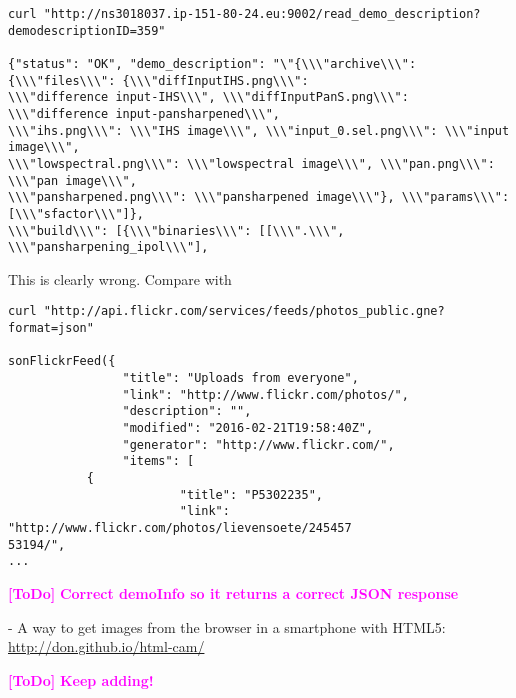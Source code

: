 \documentclass[a4paper,12pt]{article}
\newcommand{\ToDo}[1]{\textcolor{magenta}{\textbf{[ToDo]} \textbf{#1}}}
\begin{document}
\begin{verbatim}
curl "http://ns3018037.ip-151-80-24.eu:9002/read_demo_description?demodescriptionID=359"

{"status": "OK", "demo_description": "\"{\\\"archive\\\": {\\\"files\\\": {\\\"diffInputIHS.png\\\":
\\\"difference input-IHS\\\", \\\"diffInputPanS.png\\\": \\\"difference input-pansharpened\\\",
\\\"ihs.png\\\": \\\"IHS image\\\", \\\"input_0.sel.png\\\": \\\"input image\\\",
\\\"lowspectral.png\\\": \\\"lowspectral image\\\", \\\"pan.png\\\": \\\"pan image\\\",
\\\"pansharpened.png\\\": \\\"pansharpened image\\\"}, \\\"params\\\": [\\\"sfactor\\\"]},
\\\"build\\\": [{\\\"binaries\\\": [[\\\".\\\", \\\"pansharpening_ipol\\\"],
\end{verbatim}

This is clearly wrong. Compare with
\begin{verbatim}
curl "http://api.flickr.com/services/feeds/photos_public.gne?format=json"

sonFlickrFeed({
                "title": "Uploads from everyone",
                "link": "http://www.flickr.com/photos/",
                "description": "",
                "modified": "2016-02-21T19:58:40Z",
                "generator": "http://www.flickr.com/",
                "items": [
           {
                        "title": "P5302235",
                        "link": "http://www.flickr.com/photos/lievensoete/245457
53194/",
...
\end{verbatim}
\ToDo{Correct demoInfo so it returns a correct JSON response}

- A way to get images from the browser in a smartphone with HTML5: \url{http://don.github.io/html-cam/}

\ToDo{Keep adding!}




\end{document}
